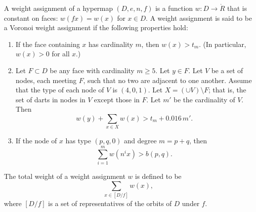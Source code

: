 \documentclass{article} %
\begin{document}
A weight assignment of a hypermap $(D,e,n,f)$ is a function $w:D \to \ring{R}$ that
is constant on faces: $w(f x) = w(x)$ for $x\in D$.  A weight assignment is said to be a Voronoi weight assignment
if the following properties hold:
\begin{enumerate}
\item If the face containing $x$ has cardinality $m$, then $w(x)> t_m$.
(In particular, $w(x)>0$ for all $x$.)
\item Let $F\subset D$ 
be any face with cardinality $m \ge 5$.  Let $y\in F$.
Let $V$ be a set of nodes, each meeting $F$, such
that no two are adjacent to one another.  
Assume that the type of each node of $V$ is $(4,0,1)$.
Let $X =(\cup V)\setminus F$;
that is, the set of darts in nodes in $V$ except those in $F$.
Let $m'$ be the cardinality of $V$.
Then
$$
w(y) + \sum_{x\in X} w(x) > t_m  +  0.016\, m'.
$$
\item If the node of $x$ has type $(p,q,0)$ and degree $m=p+q$, then
  $$
  \sum_{i=1}^m w(n^i x) > b(p,q).
  $$
\end{enumerate}
The total weight of a weight assignment $w$ is defined to be
$$
\sum_{x\in [D/f]}  w(x),
$$
where $[D/f]$ is a set of representatives of the orbits of $D$ under $f$.
\end{document}
